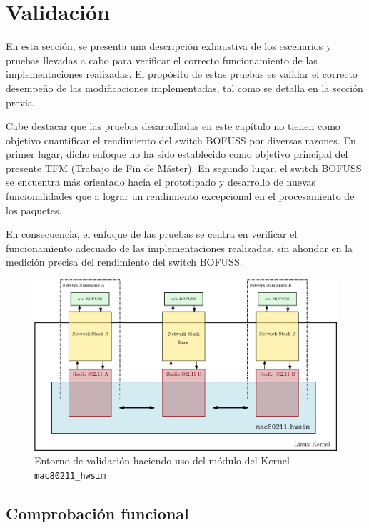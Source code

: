 \section{Validación}
\label{sec:vali}

En esta sección, se presenta una descripción exhaustiva de los escenarios y pruebas llevadas a cabo para verificar el correcto funcionamiento de las implementaciones realizadas. El propósito de estas pruebas es validar el correcto desempeño de las modificaciones implementadas, tal como se detalla en la sección previa.

Cabe destacar que las pruebas desarrolladas en este capítulo no tienen como objetivo cuantificar el rendimiento del switch BOFUSS por diversas razones. En primer lugar, dicho enfoque no ha sido establecido como objetivo principal del presente TFM (Trabajo de Fin de Máster). En segundo lugar, el switch BOFUSS se encuentra más orientado hacia el prototipado y desarrollo de nuevas funcionalidades que a lograr un rendimiento excepcional en el procesamiento de los paquetes.

En consecuencia, el enfoque de las pruebas se centra en verificar el funcionamiento adecuado de las implementaciones realizadas, sin ahondar en la medición precisa del rendimiento del switch BOFUSS.


\begin{figure}[ht]
    \centering
    \includegraphics[width=\textwidth]{archivos/img/dev/scenario_eva.eps}
    \caption{Entorno de validación haciendo uso del módulo del Kernel \texttt{mac80211\_hwsim}}
    \label{fig:scenario_eva}
\end{figure}


\subsection{Comprobación funcional}

